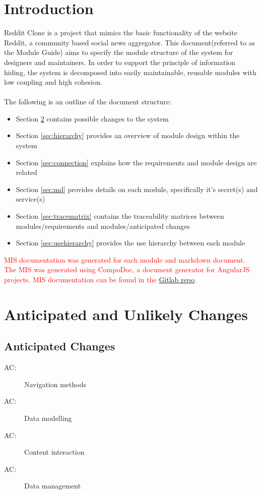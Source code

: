 \documentclass[12pt,fleqn]{article}
\newcounter{acnum}
\newcommand{\actheacnum}{AC\theacnum}
\begin{document}
\section{Introduction}
Reddit Clone is a project that mimics the basic functionality of the website Reddit, a community based social news aggregator. This document(referred to as the Module Guide) aims to specify the module structure of the system for designers and maintainers. In order to support the principle of information hiding, the system is decomposed into easily maintainable, reusable modules with low coupling and high cohesion.\\
\\
The following is an outline of the document structure:
\begin{itemize}
    \item Section \ref{sec:changes} contains possible changes to the system
    \item Section \ref{sec:hierarchy} provides an overview of module design within the system
    \item Section \ref{sec:connection} explains how the requirements and module design are related
    \item Section \ref{sec:md} provides details on each module, specifically it's  secret(s) and service(s)
    \item Section \ref{sec:tracematrix} contains the traceability matrices between modules/requirements and modules/anticipated changes
    \item Section \ref{sec:usehierarchy} provides the use hierarchy between each module
 
\end{itemize}
\textcolor{red}{
MIS documentation was generated for each module and markdown document.  The MIS was generated using CompoDoc, a document generator for AngularJS projects.  MIS documentation can be found in the \href{https://gitlab.cas.mcmaster.ca/trudeaua/reddit-clone/tree/master/Documentation/MIS}{Gitlab repo}.}

\section{Anticipated and Unlikely Changes} \label{sec:changes}
\subsection{Anticipated Changes} \label{subsec:anticipated}
\begin{description}
\item[ \actheacnum:] Navigation methods
\item[ \actheacnum:] Data modelling
\item[ \actheacnum:] Content interaction
\item[ \actheacnum:] Data management
\end{description}
\end{document}
